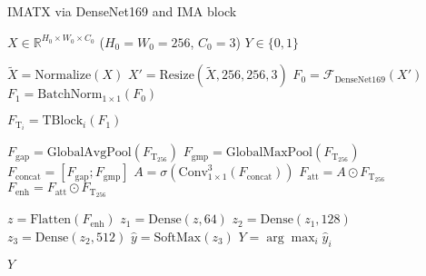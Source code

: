 \begin{algorithm}
\caption{IMATX via DenseNet169 and IMA block}
\label{alg:cervical_cancer_detection}
\begin{algorithmic}[1]
\REQUIRE $X \in \mathbb{R}^{H_0 \times W_0 \times C_0}$ ($H_0=W_0=256$, $C_0=3$)
\ENSURE $Y \in \{0,1\}$

\STATE $\tilde{X} = \mathrm{Normalize}(X)$
\STATE $X' = \mathrm{Resize}(\tilde{X}, 256, 256, 3)$
\STATE $F_0 = \mathcal{F}_{\text{DenseNet169}}(X')$
\STATE $F_1 = \mathrm{BatchNorm}_{1 \times 1}(F_0)$

  \STATE $F_{\text{T}_i} = \mathrm{TBlock}_i(F_1)$
\ENDFOR

\STATE $F_{\text{gap}} = \mathrm{GlobalAvgPool}(F_{\text{T}_{256}})$
\STATE $F_{\text{gmp}} = \mathrm{GlobalMaxPool}(F_{\text{T}_{256}})$
\STATE $F_{\text{concat}} = [F_{\text{gap}}; F_{\text{gmp}}]$
\STATE $A = \sigma(\mathrm{Conv}_{1 \times 1}^3(F_{\text{concat}}))$
\STATE $F_{\text{att}} = A \odot F_{\text{T}_{256}}$
\STATE $F_{\text{enh}} = F_{\text{att}} \odot F_{\text{T}_{256}}$

\STATE $z = \mathrm{Flatten}(F_{\text{enh}})$
\STATE $z_1 = \mathrm{Dense}(z, 64)$
\STATE $z_2 = \mathrm{Dense}(z_1, 128)$
\STATE $z_3 = \mathrm{Dense}(z_2, 512)$
\STATE $\hat{y} = \mathrm{SoftMax}(z_3)$
\STATE $Y = \arg\max_i \hat{y}_i$

\RETURN $Y$
\end{algorithmic}
\end{algorithm}
